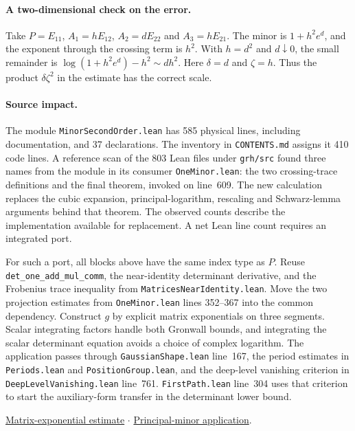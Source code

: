 \documentclass[11pt,letterpaper]{article}
\begin{document}
\paragraph{A two-dimensional check on the error.}
Take $P=E_{11}$, $A_1=hE_{12}$, $A_2=dE_{22}$ and $A_3=hE_{21}$.
The minor is $1+h^2 e^d$, and the exponent through the crossing term is
$h^2$. With $h=d^2$ and $d\downarrow0$, the small remainder is
$\log(1+h^2e^d)-h^2\sim dh^2$. Here $\delta=d$ and $\zeta=h$.
Thus the product $\delta\zeta^2$ in the estimate has the correct scale.

\paragraph{Source impact.}
The module \texttt{MinorSecondOrder.lean} has 585 physical lines, including
documentation, and 37 declarations. The inventory in \texttt{CONTENTS.md}
assigns it 410 code lines. A reference scan of the 803 Lean files under
\texttt{grh/src} found three names from the module in its consumer
\texttt{OneMinor.lean}: the two crossing-trace definitions and the final
theorem, invoked on line~609. The new calculation replaces the cubic
expansion, principal-logarithm, rescaling and Schwarz-lemma arguments
behind that theorem. The observed counts describe the implementation
available for replacement. A net Lean line count requires an integrated port.

For such a port, all blocks above have the same index type as $P$. Reuse
\texttt{det\_one\_add\_mul\_comm}, the near-identity determinant derivative,
and the Frobenius trace inequality from \texttt{MatricesNearIdentity.lean}.
Move the two projection estimates from \texttt{OneMinor.lean} lines
352--367 into the common dependency. Construct $g$ by explicit
matrix exponentials on three segments. Scalar integrating factors handle
both Gronwall bounds, and integrating the scalar determinant equation
avoids a choice of complex logarithm. The application passes through
\texttt{GaussianShape.lean} line~167, the period estimates in
\texttt{Periods.lean} and \texttt{PositionGroup.lean}, and the deep-level
vanishing criterion in \texttt{DeepLevelVanishing.lean} line~761.
\texttt{FirstPath.lean} line~304 uses that criterion to start the
auxiliary-form transfer in the determinant lower bound.
\par \href{https://github.com/VladimirReshetnikov/ProveIt/blob/8f274fb25a0be551cbb53ee802033689da108138/Analysis/GeneralizedRiemannHypothesis/Lean/grh/src/New/Appendix/DiscreteSeries/MinorSecondOrder.lean#L551-L581}{Matrix-exponential estimate} $\cdot$ \href{https://github.com/VladimirReshetnikov/ProveIt/blob/8f274fb25a0be551cbb53ee802033689da108138/Analysis/GeneralizedRiemannHypothesis/Lean/grh/src/New/Appendix/DiscreteSeries/OneMinor.lean#L599-L617}{Principal-minor application}.
\end{document}
